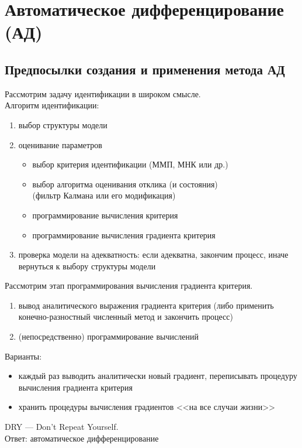 \documentclass{beamer}
\begin{document}
\section{Автоматическое дифференцирование (АД)}

\subsection{Предпосылки создания и применения метода АД}

\begin{frame}{\secname}{\subsecname}
  Рассмотрим задачу идентификации в широком смысле. \\

  Алгоритм идентификации: 
  \begin{enumerate}
	\item выбор структуры модели
	\item оценивание параметров
	\begin{itemize}
	  \item выбор критерия идентификации (ММП, МНК или др.)
	  \item выбор алгоритма оценивания отклика (и состояния) \\(фильтр Калмана
		или его модификация)
	  \item программирование вычисления критерия
	  \item программирование вычисления градиента критерия
	\end{itemize}
	\item проверка модели на адекватность: если адекватна, закончим процесс,
	  иначе вернуться к выбору структуры модели
  \end{enumerate}
  
\end{frame}

\begin{frame}{\secname}{\subsecname}
  Рассмотрим этап программирования вычисления градиента критерия.
  \begin{enumerate}
	\item вывод аналитического выражения градиента критерия (либо применить
	  конечно-разностный численный метод и закончить процесс)
	\item (непосредственно) программирование вычислений
  \end{enumerate}
\end{frame}

\begin{frame}{\secname}{\subsecname}
  Варианты:
  \begin{itemize}
	\item каждый раз выводить аналитически новый градиент, переписывать
	процедуру вычисления градиента критерия
  \item хранить процедуры вычисления градиентов <<на все случаи жизни>>
  \end{itemize}
  DRY --- Don't Repeat Yourself. \\
  Ответ: автоматическое дифференцирование
\end{frame}
\end{document}
